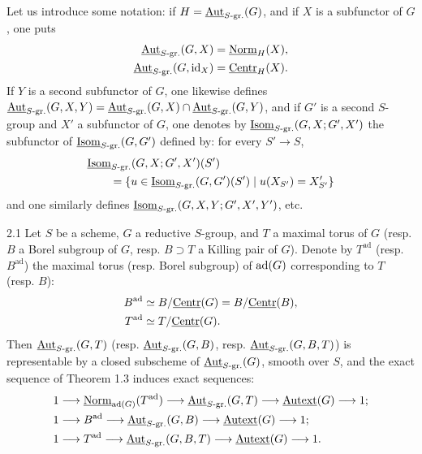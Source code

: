 Let us introduce some notation: if $H=\underline{\operatorname{Aut}}_{S\text{-gr.}}(G)$, and if $X$ is a subfunctor of $G$, one puts
\[
\begin{aligned}
\underline{\operatorname{Aut}}_{S\text{-gr.}}(G,X)&=\underline{\mathrm{Norm}}_H(X),\\
\underline{\operatorname{Aut}}_{S\text{-gr.}}(G,\mathrm{id}_X)&=\underline{\mathrm{Centr}}_H(X).
\end{aligned}
\]
If $Y$ is a second subfunctor of $G$, one likewise defines $\underline{\operatorname{Aut}}_{S\text{-gr.}}(G,X,Y)=\underline{\operatorname{Aut}}_{S\text{-gr.}}(G,X)\cap\underline{\operatorname{Aut}}_{S\text{-gr.}}(G,Y)$, and if $G'$ is a second $S$-group and $X'$ a subfunctor of $G$, one denotes by $\underline{\operatorname{Isom}}_{S\text{-gr.}}(G,X;G',X')$ the subfunctor of $\underline{\operatorname{Isom}}_{S\text{-gr.}}(G,G')$ defined by: for every $S'\to S$,
\[
\begin{aligned}
&\underline{\operatorname{Isom}}_{S\text{-gr.}}(G,X;G',X')(S')\\
&\qquad=\{u\in\underline{\operatorname{Isom}}_{S\text{-gr.}}(G,G')(S')\mid u(X_{S'})=X'_{S'}\}
\end{aligned}
\]
and one similarly defines $\underline{\operatorname{Isom}}_{S\text{-gr.}}(G,X,Y;G',X',Y')$, etc.
\begin{proposition}{2.1}\label{XXIV.2.1}
Let $S$ be a scheme, $G$ a reductive $S$-group, and $T$ a maximal torus of $G$ (resp. $B$ a Borel subgroup of $G$, resp. $B\supset T$ a Killing pair of $G$). Denote by $T^{\mathrm{ad}}$ (resp. $B^{\mathrm{ad}}$) the maximal torus (resp. Borel subgroup) of $\operatorname{ad}(G)$ corresponding to $T$ (resp. $B$):
\[
\begin{aligned}
B^{\mathrm{ad}}&\simeq B/\underline{\mathrm{Centr}}(G)=B/\underline{\mathrm{Centr}}(B),\\
T^{\mathrm{ad}}&\simeq T/\underline{\mathrm{Centr}}(G).
\end{aligned}
\]
Then $\underline{\operatorname{Aut}}_{S\text{-gr.}}(G,T)$ (resp. $\underline{\operatorname{Aut}}_{S\text{-gr.}}(G,B)$, resp. $\underline{\operatorname{Aut}}_{S\text{-gr.}}(G,B,T)$) is representable by a closed subscheme of $\underline{\operatorname{Aut}}_{S\text{-gr.}}(G)$, smooth over $S$, and the exact sequence of Theorem 1.3 induces exact sequences:
\[
\begin{aligned}
1&\longrightarrow\underline{\mathrm{Norm}}_{\operatorname{ad}(G)}(T^{\mathrm{ad}})\longrightarrow\underline{\operatorname{Aut}}_{S\text{-gr.}}(G,T)\longrightarrow\underline{\operatorname{Autext}}(G)\longrightarrow1;\\
1&\longrightarrow B^{\mathrm{ad}}\longrightarrow\underline{\operatorname{Aut}}_{S\text{-gr.}}(G,B)\longrightarrow\underline{\operatorname{Autext}}(G)\longrightarrow1;\\
1&\longrightarrow T^{\mathrm{ad}}\longrightarrow\underline{\operatorname{Aut}}_{S\text{-gr.}}(G,B,T)\longrightarrow\underline{\operatorname{Autext}}(G)\longrightarrow1.
\end{aligned}
\]
\end{proposition}
